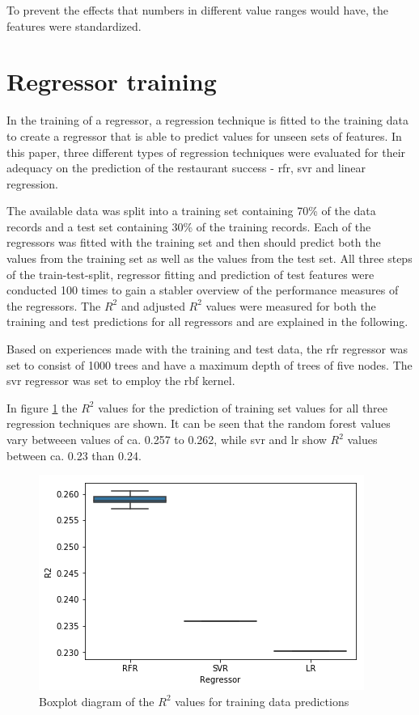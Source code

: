 \documentclass[a4paper, 11pt, oneside]{Thesis}  %
\begin{document}
To prevent the effects that numbers in different value ranges would have, the features were standardized.

\section{Regressor training}
\label{regressor_training}

In the training of a regressor, a regression technique is fitted to the training data to create a regressor that is able to predict values for unseen sets of features. In this paper, three different types of regression techniques were evaluated for their adequacy on the prediction of the restaurant success - \ac{rfr}, \ac{svr} and linear regression.

The available data was split into a training set containing 70\% of the data records and a test set containing 30\% of the training records. Each of the regressors was fitted with the training set and then should predict both the values from the training set as well as the values from the test set. All three steps of the train-test-split, regressor fitting and prediction of test features were conducted 100 times to gain a stabler overview of the performance measures of the regressors. The $R^2$ and adjusted $R^2$ values were measured for both the training and test predictions for all regressors and are explained in the following.

Based on experiences made with the training and test data, the \ac{rfr} regressor was set to consist of 1000 trees and have a maximum depth of trees of five nodes. The \ac{svr} regressor was set to employ the \ac{rbf} kernel.

In figure \ref{fig:boxplot_r2_training_data} the $R^2$ values for the prediction of training set values for all three regression techniques are shown. It can be seen that the random forest values vary betweeen values of ca. 0.257 to 0.262, while \ac{svr} and \ac{lr} show $R^2$ values between ca. 0.23 than 0.24.

\begin{figure}[h]
\includegraphics[scale=0.7]{Figures/Regressor_comparison/boxplot_r2_training_data.png}
\centering
\caption{Boxplot diagram of the $R^2$ values for training data predictions}
\label{fig:boxplot_r2_training_data}
\end{figure}
\end{document}
